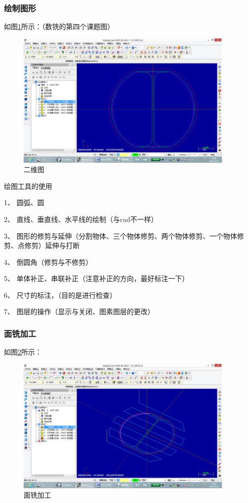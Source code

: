 \subsubsection{绘制图形}
如图\ref{二维图}所示：（数铣的第四个课题图）
\begin{figure}[!hbtp]
	\centering	\includegraphics[width=0.95\textwidth]{images/15-1}
	\caption{二维图} \label{二维图}
\end{figure}

绘图工具的使用

1、	圆弧、圆\par
2、	直线、垂直线、水平线的绘制（与cad不一样）\par
3、	图形的修剪与延伸（分割物体、三个物体修剪、两个物体修剪、一个物体修剪、点修剪）延伸与打断\par
4、	倒圆角（修剪与不修剪）\par
5、	单体补正、串联补正（注意补正的方向，最好标注一下）\par
6、	尺寸的标注，（目的是进行检查）\par
7、	图层的操作（显示与关闭、图素图层的更改）\par
\subsubsection{面铣加工}
如图\ref{面铣加工}所示：
\begin{figure}[!hbtp]
	\centering	\includegraphics[width=0.95\textwidth]{images/15-2}
	\caption{面铣加工} \label{面铣加工}
\end{figure}

